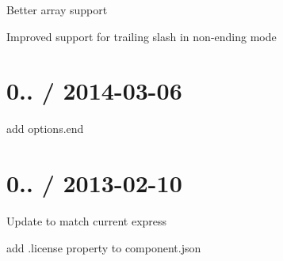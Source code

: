 
\begin{DoxyItemize}
\item Better array support
\item Improved support for trailing slash in non-\/ending mode
\end{DoxyItemize}

\section*{0.. / 2014-\/03-\/06 }


\begin{DoxyItemize}
\item add options.\+end
\end{DoxyItemize}

\section*{0.. / 2013-\/02-\/10 }


\begin{DoxyItemize}
\item Update to match current express
\item add .license property to component.\+json 
\end{DoxyItemize}